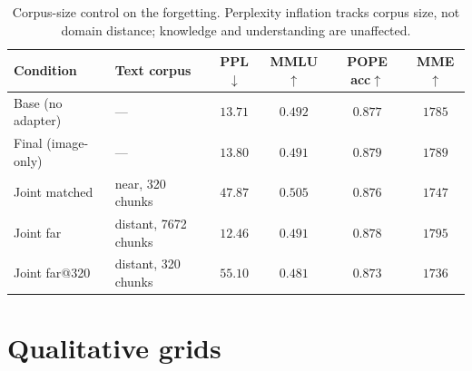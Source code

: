 \documentclass{article}
\begin{document}
\begin{table}[t]
\centering\small
\setlength{\tabcolsep}{6pt}
\begin{tabular}{llcccc}
\toprule
\textbf{Condition} & \textbf{Text corpus} & \textbf{PPL}$\downarrow$ & \textbf{MMLU}$\uparrow$ & \textbf{POPE acc}$\uparrow$ & \textbf{MME}$\uparrow$ \\
\midrule
Base (no adapter) & ---                  & $13.71$ & $0.492$ & $0.877$ & $1785$ \\
Final (image-only)& ---                  & $13.80$ & $0.491$ & $0.879$ & $1789$ \\
Joint matched     & near, 320 chunks     & $47.87$ & $0.505$ & $0.876$ & $1747$ \\
Joint far         & distant, 7672 chunks & $12.46$ & $0.491$ & $0.878$ & $1795$ \\
Joint far@320     & distant, 320 chunks  & $55.10$ & $0.481$ & $0.873$ & $1736$ \\
\bottomrule
\end{tabular}
\caption{Corpus-size control on the forgetting. Perplexity inflation
tracks corpus size, not domain distance; knowledge and understanding are
unaffected.}
\label{tab:joint}
\end{table}


\section{Qualitative grids}
\label{app:grids}
\end{document}
